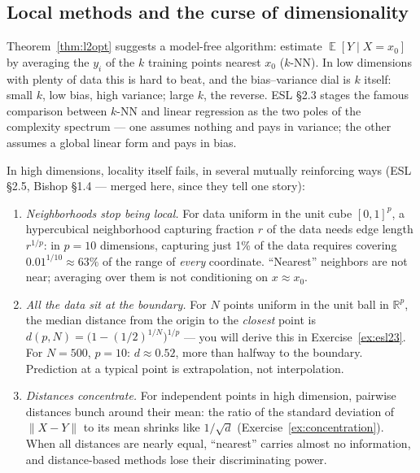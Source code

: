 \documentclass[11pt]{article}
\numberwithin{equation}{section}
\theoremstyle{plain}
\theoremstyle{definition}
\theoremstyle{remark}
\DeclareMathOperator{\E}{\mathbb{E}}
\newcommand{\R}{\mathbb{R}}
\begin{document}
\subsection{Local methods and the curse of dimensionality}

Theorem~\ref{thm:l2opt} suggests a model-free algorithm: estimate $\E[Y \mid X = x_0]$ by averaging the $y_i$ of the $k$ training points nearest $x_0$ ($k$-NN). In low dimensions with plenty of data this is hard to beat, and the bias--variance dial is $k$ itself: small $k$, low bias, high variance; large $k$, the reverse. ESL \S2.3 stages the famous comparison between $k$-NN and linear regression as the two poles of the complexity spectrum --- one assumes nothing and pays in variance; the other assumes a global linear form and pays in bias.

In high dimensions, locality itself fails, in several mutually reinforcing ways (ESL \S2.5, Bishop \S1.4 --- merged here, since they tell one story):

\begin{enumerate}[leftmargin=2em,itemsep=0.2em]
\item \emph{Neighborhoods stop being local.} For data uniform in the unit cube $[0,1]^p$, a hypercubical neighborhood capturing fraction $r$ of the data needs edge length $r^{1/p}$: in $p = 10$ dimensions, capturing just 1\% of the data requires covering $0.01^{1/10} \approx 63\%$ of the range of \emph{every} coordinate. ``Nearest'' neighbors are not near; averaging over them is not conditioning on $x \approx x_0$.
\item \emph{All the data sit at the boundary.} For $N$ points uniform in the unit ball in $\R^p$, the median distance from the origin to the \emph{closest} point is $d(p, N) = \big(1 - (1/2)^{1/N}\big)^{1/p}$ --- you will derive this in Exercise~\ref{ex:esl23}. For $N = 500$, $p = 10$: $d \approx 0.52$, more than halfway to the boundary. Prediction at a typical point is extrapolation, not interpolation.
\item \emph{Distances concentrate.} For independent points in high dimension, pairwise distances bunch around their mean: the ratio of the standard deviation of $\|X - Y\|$ to its mean shrinks like $1/\sqrt{d}$ (Exercise~\ref{ex:concentration}). When all distances are nearly equal, ``nearest'' carries almost no information, and distance-based methods lose their discriminating power.
\end{enumerate}
\end{document}
